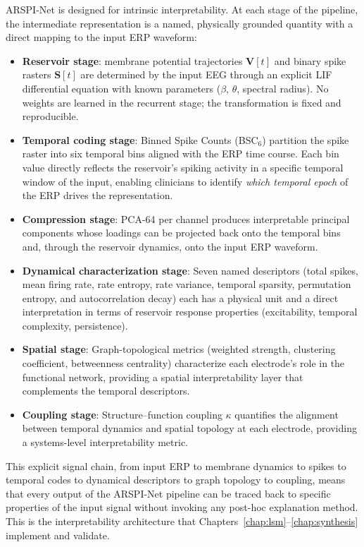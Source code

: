 ARSPI-Net is designed for intrinsic interpretability. At each stage of the pipeline, the intermediate representation is a named, physically grounded quantity with a direct mapping to the input ERP waveform:
\begin{itemize}
    \item \textbf{Reservoir stage}: membrane potential trajectories $\mathbf{V}[t]$ and binary spike rasters $\mathbf{S}[t]$ are determined by the input EEG through an explicit LIF differential equation with known parameters ($\beta$, $\theta$, spectral radius). No weights are learned in the recurrent stage; the transformation is fixed and reproducible.
    \item \textbf{Temporal coding stage}: Binned Spike Counts (BSC$_6$) partition the spike raster into six temporal bins aligned with the ERP time course. Each bin value directly reflects the reservoir's spiking activity in a specific temporal window of the input, enabling clinicians to identify \emph{which temporal epoch} of the ERP drives the representation.
    \item \textbf{Compression stage}: PCA-64 per channel produces interpretable principal components whose loadings can be projected back onto the temporal bins and, through the reservoir dynamics, onto the input ERP waveform.
    \item \textbf{Dynamical characterization stage}: Seven named descriptors (total spikes, mean firing rate, rate entropy, rate variance, temporal sparsity, permutation entropy, and autocorrelation decay) each has a physical unit and a direct interpretation in terms of reservoir response properties (excitability, temporal complexity, persistence).
    \item \textbf{Spatial stage}: Graph-topological metrics (weighted strength, clustering coefficient, betweenness centrality) characterize each electrode's role in the functional network, providing a spatial interpretability layer that complements the temporal descriptors.
    \item \textbf{Coupling stage}: Structure--function coupling $\kappa$ quantifies the alignment between temporal dynamics and spatial topology at each electrode, providing a systems-level interpretability metric.
\end{itemize}

This explicit signal chain, from input ERP to membrane dynamics to spikes to temporal codes to dynamical descriptors to graph topology to coupling, means that every output of the ARSPI-Net pipeline can be traced back to specific properties of the input signal without invoking any post-hoc explanation method. This is the interpretability architecture that Chapters~\ref{chap:lsm}--\ref{chap:synthesis} implement and validate.

